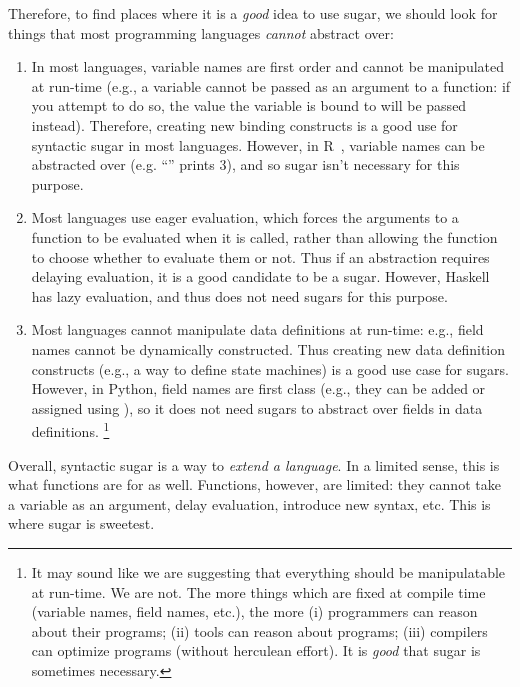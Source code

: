 Therefore, to find places where it is a \emph{good} idea to use sugar,
we should look for things that most programming languages
\emph{cannot} abstract over:
\begin{enumerate}
  \item In most languages, variable names are first order and cannot
    be manipulated at run-time (e.g., a variable cannot be passed as
    an argument to a function: if you attempt to do so, the value the
    variable is bound to will be passed instead). Therefore, creating
    new binding constructs is a good use for syntactic sugar in most
    languages. However, in R~\cite{rlang}, variable names can be abstracted
    over (e.g. ``'' prints 3), and so sugar isn't
    necessary for this purpose.
  \item Most languages use eager evaluation,
    which forces the arguments to a function to be
    evaluated when it is called, rather than allowing the function to
    choose whether to
    evaluate them or not. Thus if an abstraction requires delaying
    evaluation, it is a good candidate to be a sugar. However, Haskell
    has lazy evaluation, and thus does not need sugars for this purpose.
  \item Most languages cannot manipulate data definitions at run-time:
    e.g., field names cannot be dynamically constructed. Thus creating
    new data definition constructs (e.g., a way to define state
    machines) is a good use case for sugars. However, in Python, field
    names are first class (e.g., they can be added or assigned using
    ), so it does not need sugars to abstract over fields
    in data definitions.%
    \footnote{
    It may sound like we are suggesting that everything should be
    manipulatable at run-time. We are not. The more
    things which are fixed at compile time (variable names, field
    names, etc.), the more (i) programmers can reason about their
    programs; (ii) tools can reason about programs; (iii) compilers
    can optimize programs (without herculean effort). It is
    \emph{good} that sugar is sometimes necessary.
  }
\end{enumerate}

Overall, syntactic sugar is a way to \emph{extend a language}.
In a limited sense, this is what functions are for as well.
Functions, however, are limited: they cannot take a variable as an
argument, delay evaluation, introduce new syntax, etc. This is where
sugar is sweetest.


